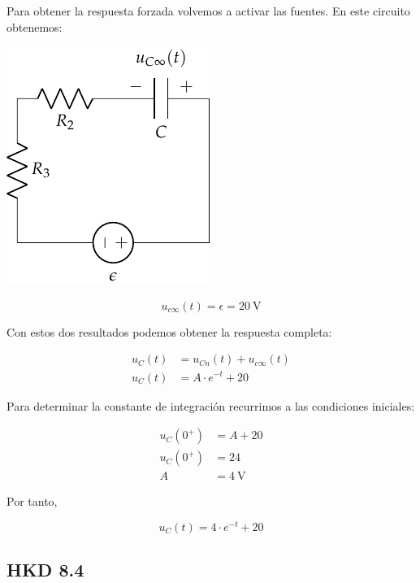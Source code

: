 \documentclass[12pt]{article}
\begin{document}
Para obtener la respuesta forzada volvemos a activar las fuentes. En este circuito obtenemos:

\begin{minipage}{0.3\textwidth}
\includegraphics{figs/FM_4_3_forzada}
\end{minipage}
\begin{minipage}{0.7\textwidth}
  \begin{equation*}
    u_{c\infty}(t) = \epsilon = \SI{20}{\volt}
  \end{equation*}
\end{minipage}

Con estos dos resultados podemos obtener la respuesta completa:

\begin{align*}
  u_C(t) &= u_{Cn}(t) + u_{c\infty}(t)\\
  u_C(t) &= A \cdot e^{-t} + 20
\end{align*}

Para determinar la constante de integración recurrimos a las condiciones iniciales:

\begin{align*}
  u_C(0^+) &= A + 20\\
  u_C(0^+) &= 24\\
  A &= \SI{4}{\volt}
\end{align*}

Por tanto,

\begin{equation*}
  u_C(t) = 4 \cdot e^{-t} + 20
\end{equation*}

\clearpage

\subsection{HKD 8.4}
\end{document}
